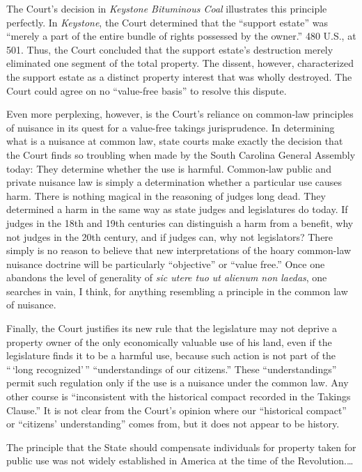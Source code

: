 The Court's decision in \textit{Keystone Bituminous Coal} illustrates this
principle perfectly. In \textit{Keystone}, the Court determined that the
``support estate'' was ``merely a part of the entire bundle of rights possessed
by the owner.'' 480 U.S., at 501. Thus, the Court concluded that the support
estate's destruction merely eliminated one segment of the total property. The
dissent, however, characterized the support estate as a distinct property
interest that was wholly destroyed. The Court could agree on no ``value-free
basis'' to resolve this dispute.

Even more perplexing, however, is the Court's reliance on common-law principles
of nuisance in its quest for a value-free takings jurisprudence. In determining
what is a nuisance at common law, state courts make exactly the decision that
the Court finds so troubling when made by the South Carolina General Assembly
today: They determine whether the use is harmful. Common-law public and private
nuisance law is simply a determination whether a particular use causes harm.
There is nothing magical in the reasoning of judges long dead. They determined a
harm in the same way as state judges and legislatures do today. If judges in the
18th and 19th centuries can distinguish a harm from a benefit, why not judges in
the 20th century, and if judges can, why not legislators? There simply is no
reason to believe that new interpretations of the hoary common-law nuisance
doctrine will be particularly ``objective'' or ``value free.'' Once one abandons
the level of generality of \textit{sic utere tuo ut alienum non laedas}, one
searches in vain, I think, for anything resembling a principle in the common law
of nuisance.

Finally, the Court justifies its new rule that the legislature may not deprive a
property owner of the only economically valuable use of his land, even if the
legislature finds it to be a harmful use, because such action is not part of the
``\,`long recognized'\,'' ``understandings of our citizens.'' These
``understandings'' permit such regulation only if the use is a nuisance under
the common law. Any other course is ``inconsistent with the historical compact
recorded in the Takings Clause.'' It is not clear from the Court's opinion where
our ``historical compact'' or ``citizens' understanding'' comes from, but it
does not appear to be history.

The principle that the State should compensate individuals for property taken
for public use was not widely established in America at the time of the
Revolution.\ldots

